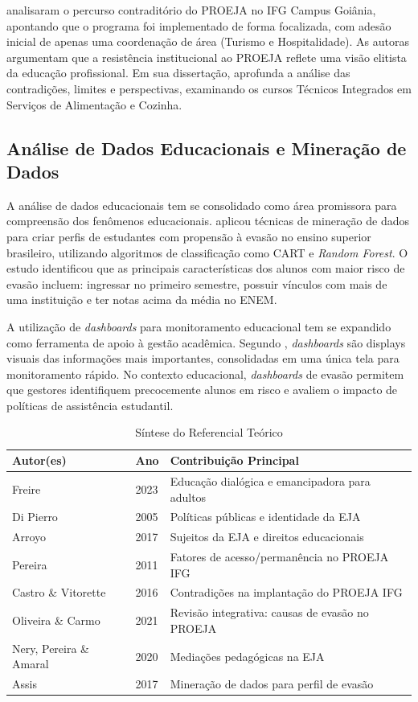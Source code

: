\documentclass[12pt,a4paper]{article}
\begin{document}
 analisaram o percurso contraditório do PROEJA no IFG Campus Goiânia, apontando que o programa foi implementado de forma focalizada, com adesão inicial de apenas uma coordenação de área (Turismo e Hospitalidade). As autoras argumentam que a resistência institucional ao PROEJA reflete uma visão elitista da educação profissional. Em sua dissertação,  aprofunda a análise das contradições, limites e perspectivas, examinando os cursos Técnicos Integrados em Serviços de Alimentação e Cozinha.

\subsection{Análise de Dados Educacionais e Mineração de Dados}

A análise de dados educacionais tem se consolidado como área promissora para compreensão dos fenômenos educacionais.  aplicou técnicas de mineração de dados para criar perfis de estudantes com propensão à evasão no ensino superior brasileiro, utilizando algoritmos de classificação como CART e \textit{Random Forest}. O estudo identificou que as principais características dos alunos com maior risco de evasão incluem: ingressar no primeiro semestre, possuir vínculos com mais de uma instituição e ter notas acima da média no ENEM.

A utilização de \textit{dashboards} para monitoramento educacional tem se expandido como ferramenta de apoio à gestão acadêmica. Segundo , \textit{dashboards} são displays visuais das informações mais importantes, consolidadas em uma única tela para monitoramento rápido. No contexto educacional, \textit{dashboards} de evasão permitem que gestores identifiquem precocemente alunos em risco e avaliem o impacto de políticas de assistência estudantil.

\begin{table}[h!]
\centering
\caption{Síntese do Referencial Teórico}
\label{tab:referencial}
\begin{tabular}{p{4cm}p{3.5cm}p{6cm}}
\toprule
\textbf{Autor(es)} & \textbf{Ano} & \textbf{Contribuição Principal} \\
\midrule
Freire & 2023 & Educação dialógica e emancipadora para adultos \\
Di Pierro & 2005 & Políticas públicas e identidade da EJA \\
Arroyo & 2017 & Sujeitos da EJA e direitos educacionais \\
Pereira & 2011 & Fatores de acesso/permanência no PROEJA IFG \\
Castro \& Vitorette & 2016 & Contradições na implantação do PROEJA IFG \\
Oliveira \& Carmo & 2021 & Revisão integrativa: causas de evasão no PROEJA \\
Nery, Pereira \& Amaral & 2020 & Mediações pedagógicas na EJA \\
Assis & 2017 & Mineração de dados para perfil de evasão \\
\bottomrule
\end{tabular}
\end{table}
\end{document}
